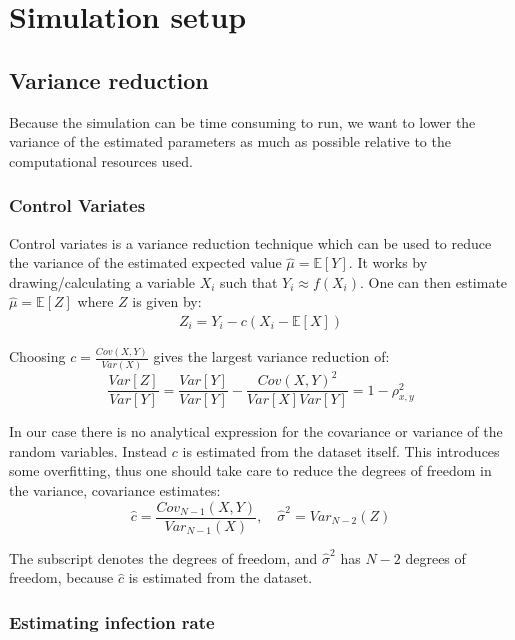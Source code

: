 \section{Simulation setup}
\subsection{Variance reduction}
Because the simulation can be time consuming to run, we want to lower the variance of the estimated parameters as much as possible relative to the computational resources used.

\subsubsection{Control Variates}
Control variates is a variance reduction technique which can be used to reduce the variance of the estimated expected value $\hat{\mu} = \mathbb{E}[Y]$. It works by drawing/calculating a variable $X_i$ such that $Y_i \approx f(X_i)$. One can then estimate $\hat{\mu} = \mathbb{E}[Z]$ where $Z$ is given by:
\begin{align}
Z_i = Y_i - c (X_i - \mathbb{E}[X])
\end{align}

Choosing $c = \frac{Cov(X, Y)}{Var(X)}$ gives the largest variance reduction of:
\begin{equation}
\frac{Var[Z]}{Var[Y]} = \frac{Var[Y]}{Var[Y]} - \frac{Cov(X, Y)^2}{Var[X] Var[Y]} = 1 - \rho_{x, y}^2 \label{eq:variance-reduction}
\end{equation}

In our case there is no analytical expression for the covariance or variance of the random variables. Instead $c$ is estimated from the dataset itself. This introduces some overfitting, thus one should take care to reduce the degrees of freedom in the variance, covariance estimates:
\begin{equation}
\hat{c} = \frac{Cov_{N-1}(X, Y)}{Var_{N-1}(X)}, \quad \hat{\sigma}^2 = Var_{N-2}(Z)
\end{equation}

The subscript denotes the degrees of freedom, and $\hat{\sigma}^2$ has $N - 2$ degrees of freedom, because $\hat{c}$ is estimated from the dataset.

\subsubsection{Estimating infection rate}

